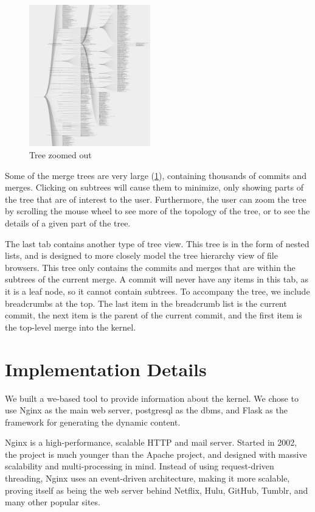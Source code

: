 \documentclass[conference, draftclsnofoot]{IEEEtran}
\begin{document}
\begin{figure}[h]
	\centering
	\includegraphics[width=0.47\textwidth]{figures/tree_zoom.png}
	\caption{Tree zoomed out}
	\label{fig:zoomed_tree}
\end{figure}

Some of the merge trees are very large (\ref{fig:zoomed_tree}), containing
thousands of commits and merges. Clicking on subtrees will cause them to
minimize, only showing parts of the tree that are of interest to the user.
Furthermore, the user can zoom the tree by scrolling the mouse wheel to see
more of the topology of the tree, or to see the details of a given part of the
tree.

The last tab contains another type of tree view. This tree is in the form of
nested lists, and is designed to more closely model the tree hierarchy view of
file browsers. This tree only contains the commits and merges that are within
the subtrees of the current merge. A commit will never have any items in this
tab, as it is a leaf node, so it cannot contain subtrees. To accompany the
tree, we include breadcrumbs at the top. The last item in the breadcrumb list
is the current commit, the next item is the parent of the current commit, and
the first item is the top-level merge into the kernel.



\section{Implementation Details}

We built a we-based tool to provide information about the kernel.
We chose to use Nginx as the main web server, postgresql as the dbms, and Flask
as the framework for generating the dynamic content.

Nginx is a high-performance, scalable HTTP and mail server. Started in 2002,
the project is much younger than the Apache project, and designed with massive
scalability and multi-processing in mind. Instead of using request-driven
threading, Nginx uses an event-driven architecture, making it more scalable,
proving itself as being the web server behind Netflix, Hulu, GitHub, Tumblr,
and many other popular sites.
\end{document}
